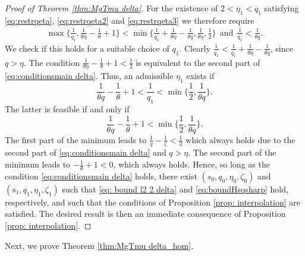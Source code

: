 \documentclass[reqno]{amsart}
\theoremstyle{plain}
\theoremstyle{remark}
\theoremstyle{plain}
\numberwithin{equation}{section}
\newcommand{\1}{\one}
\begin{document}
\begin{proof}[Proof of Theorem \ref{thm:MgTmu delta}]
For the existence of $2<\eta_1<q_1$ satisfying \eqref{eq:restrqeta}, \eqref{eq:restrqeta2} and \eqref{eq:restrqeta3} we therefore require
\begin{align}
\label{eq:cond max min Thm MgTmu delta}
\max\Big\{\frac{1}{q_1}, \frac{1}{\theta \eta} - \frac{1}{\theta}+1\Big\}<\min\Big\{ \frac{1}{q_1}   + \frac{1}{\theta \eta} - \frac{1}{\theta q}, \frac{1}{\theta \eta}, \frac12\Big\} \ \ \text{and} \ \ \frac{1}{q_1}<\frac{1}{\theta q}.
\end{align}
We check if this holds for a suitable choice of $q_1$. 
Clearly $\tfrac{1}{q_1}<\tfrac{1}{q_1}+\tfrac{1}{\theta\eta}-\tfrac{1}{\theta q}$, since $q>\eta$.
The condition $\frac{1}{\theta \eta} - \frac{1}{\theta}+1<\frac12$  is equivalent to the second part of \eqref{eq:conditionsmain delta}. Thus, an admissible  $\eta_1$ exists if 
\[\frac{1}{\theta q}- \frac{1}{\theta}+1<\frac{1}{q_1}<\min\Big\{\frac12,\frac{1}{\theta q}\Big\}.\] 
The latter is feasible if and only if 
\[\frac{1}{\theta q}- \frac{1}{\theta}+1 <\min\Big\{\frac12, \frac{1}{\theta q}\Big\}.\]
The first part of the minimum leads to 
$\frac{1}{q} - \frac1{\zeta}<\frac12$ which always holds due to the second part of \eqref{eq:conditionsmain delta} and $q>\eta$. The second part of the minimum leads to $-\frac{1}{\theta}+1<0$, which always holds. Hence, so long as the condition \eqref{eq:conditionsmain delta} holds, there exist $(s_0, q_0, \eta_0, \zeta_0)$ and $(s_1, q_1, \eta_1, \zeta_1)$ such that \eqref{eq: bound l2 2 delta} and \eqref{eq:boundHsqsharp} hold, respectively, and such that the conditions of Proposition \ref{prop: interpolation} are satisfied. The desired result is then an immediate consequence of Proposition \ref{prop: interpolation}.
\end{proof}

Next, we prove Theorem \ref{thm:MgTmu delta_hom}.
\end{document}
